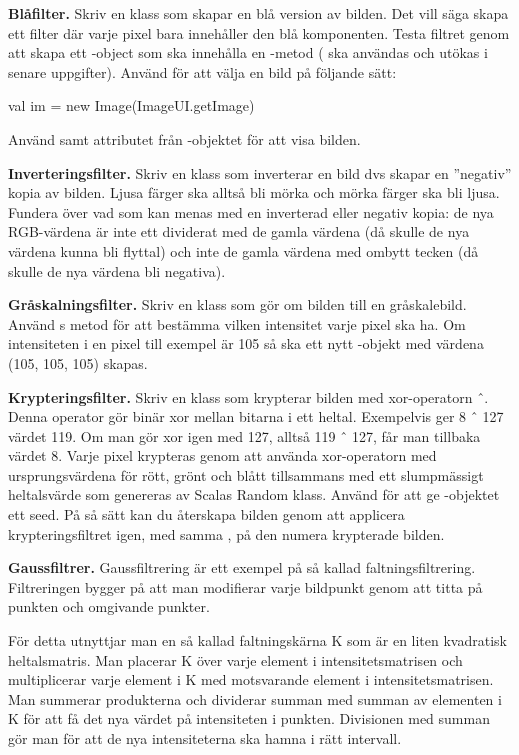\Task \textbf{Blåfilter.} Skriv en klass  som skapar en blå version av bilden. Det vill säga skapa ett filter där varje pixel bara innehåller den blå komponenten. Testa filtret genom att skapa ett -object som ska innehålla en -metod ( ska användas och utökas i senare uppgifter). Använd  för att välja en bild på följande sätt:
\begin{Code}
val im = new Image(ImageUI.getImage)
\end{Code}
Använd  samt  attributet från -objektet för att visa bilden. 

\Task \textbf{Inverteringsfilter.} Skriv en klass  som inverterar en bild dvs skapar en ''negativ'' kopia av bilden. Ljusa färger ska alltså bli mörka och mörka färger ska bli ljusa.
Fundera över vad som kan menas med en inverterad eller negativ kopia: de nya RGB-värdena är inte ett dividerat med de gamla värdena (då skulle de nya värdena kunna bli flyttal) och inte de gamla värdena med ombytt tecken (då skulle de nya värdena bli negativa).

\Task \textbf{Gråskalningsfilter.} Skriv en klass  som gör om bilden till en gråskalebild. Använd s  metod för att bestämma vilken intensitet varje pixel ska ha. Om intensiteten i en pixel till exempel är 105 så ska ett nytt -objekt med värdena (105, 105, 105) skapas.

\Task \textbf{Krypteringsfilter.} Skriv en klass  som krypterar bilden med xor-operatorn ˆ. Denna operator gör binär xor mellan bitarna i ett heltal. Exempelvis ger 8 ˆ 127 värdet 119. Om man gör xor igen med 127, alltså 119 ˆ 127, får man tillbaka värdet 8. Varje pixel krypteras genom att använda xor-operatorn med ursprungsvärdena för rött, grönt och blått tillsammans med ett slumpmässigt heltalsvärde som genereras av Scalas Random klass. Använd  för att ge -objektet ett seed. På så sätt kan du återskapa bilden genom att applicera krypteringsfiltret igen, med samma , på den numera krypterade bilden.

\Task \textbf{Gaussfiltrer.} Gaussfiltrering är ett exempel på så kallad faltningsfiltrering. Filtreringen bygger på att man modifierar varje bildpunkt genom att titta på punkten och omgivande punkter. 

För detta utnyttjar man en så kallad faltningskärna K som är en liten kvadratisk heltalsmatris. Man placerar K över varje element i intensitetsmatrisen och multiplicerar varje element i K med motsvarande element i intensitetsmatrisen. Man summerar produkterna och dividerar summan med summan av elementen i K för att få det nya värdet på intensiteten i punkten. Divisionen med summan gör man för att de nya intensiteterna ska hamna i rätt intervall.

